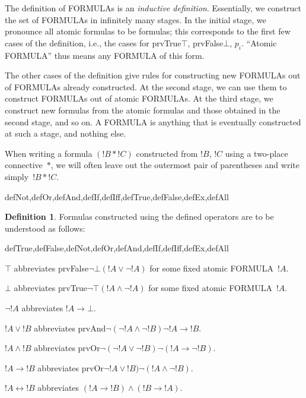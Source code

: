 \documentclass[10pt,a4paper]{article}
\newcommand*{\olup}[1]{\MakeUppercase{#1}}
\theoremstyle{plain}
\theoremstyle{definition}
\newtheorem{defn}[thm]{Definition}
\theoremstyle{remark}
\newenvironment{explain}{}{}
\providecommand{\lif}{\mathbin{\rightarrow}}
\providecommand{\ltrue}{\top}
\providecommand{\lfalse}{\bot}
\providecommand{\Obj}{}
\providecommand{\iftag}[1]{#1}
\providecommand{\tagitem}[1]{\item[#1]}
\providecommand{\liff}{\mathbin{\leftrightarrow}}
\providecommand{\iftag}{}
\begin{document}
\begin{explain}
The definition of \olup{formula}s is an
\emph{inductive definition}.  Essentially, we construct the set of
\olup{formula}s in infinitely many stages.  In the initial stage, we
pronounce all atomic formulas to be formulas; this corresponds to the
first few cases of the definition, i.e., the cases for
\iftag{prvTrue}{$\ltrue$, }{}%
\iftag{prvFalse}{$\lfalse$, }{}%
$\Obj p_i$.  ``Atomic \olup{formula}''
thus means any \olup{formula} of this form.

The other cases of the definition give rules for constructing new
\olup{formula}s out of \olup{formula}s already constructed.  At the second
stage, we can use them to construct \olup{formula}s out of atomic
\olup{formula}s.  At the third stage, we construct new formulas from the
atomic formulas and those obtained in the second stage, and so on.  A
\olup{formula} is anything that is eventually constructed at such a
stage, and nothing else.
\end{explain}

When writing a formula $(!B \ast !C)$ constructed from $!B$, $!C$
using a two-place connective~$\ast$, we will often leave out the
outermost pair of parentheses and write simply~$!B \ast !C$.

\begin{tagblock}{defNot,defOr,defAnd,defIf,defIff,defTrue,defFalse,defEx,defAll}
\begin{defn}
Formulas constructed using the defined operators are to be understood
as follows:

\begin{tagenumerate}{defTrue,defFalse,defNot,defOr,defAnd,defIf,defIff,defEx,defAll}

\tagitem{defTrue}{$\ltrue$ abbreviates
  \iftag{prvFalse}{$\lnot\lfalse$}{$(!A \lor \lnot !A)$ for some
    fixed atomic \olup{formula}~$!A$}.}{}

\tagitem{defFalse}{$\lfalse$ abbreviates
  \iftag{prvTrue}{$\lnot\ltrue$}{$(!A \land \lnot !A)$ for some
    fixed atomic \olup{formula}~$!A$}.}{}

\tagitem{defNot}{$\lnot !A$ abbreviates $!A \lif \lfalse$.}{}

\tagitem{defOr}{$!A \lor !B$ abbreviates
  \iftag{prvAnd}{$\lnot(\lnot !A \land \lnot !B)$}{$\lnot !A \lif
    !B$}.}{}

\tagitem{defAnd}{$!A \land !B$ abbreviates
  \iftag{prvOr}{$\lnot(\lnot !A \lor \lnot !B)$}{$\lnot (!A \lif
    \lnot !B)$}.}{}

\tagitem{defIf}{$!A \lif !B$ abbreviates
  \iftag{prvOr}{$\lnot !A \lor !B)$}{$\lnot (!A \land \lnot !B)$}.}{}

\tagitem{defIff}{$!A \liff !B$ abbreviates $(!A \lif !B) \land (!B
  \lif !A)$.}{}
\end{tagenumerate}
\end{defn}
\end{tagblock}
\end{document}
